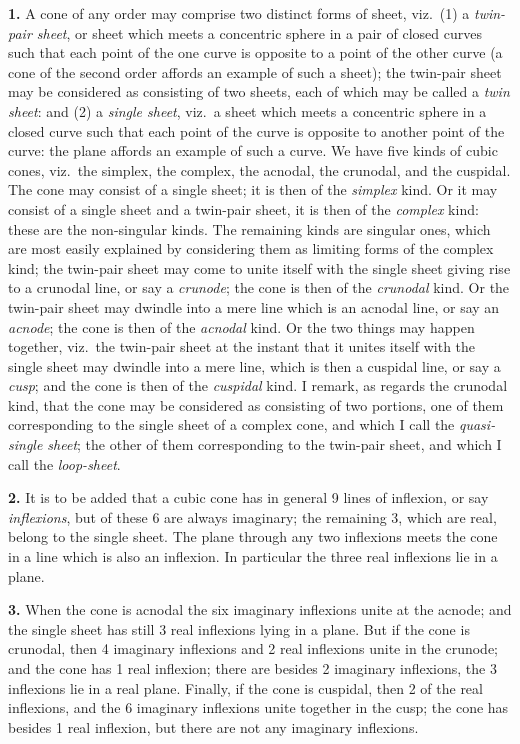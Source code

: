 \documentclass[11pt,a4paper]{article}
\theoremstyle{plain}
\begin{document}
\noindent\textbf{1.} A cone of any order may comprise two distinct forms of sheet, viz.\ (1) a \textit{twin-pair sheet}, or sheet which meets a concentric sphere in a pair of closed curves such that each point of the one curve is opposite to a point of the other curve (a cone of the second order affords an example of such a sheet); the twin-pair sheet may be considered as consisting of two sheets, each of which may be called a \textit{twin sheet}: and (2) a \textit{single sheet}, viz.\ a sheet which meets a concentric sphere in a closed curve such that each point of the curve is opposite to another point of the curve: the plane affords an example of such a curve. We have five kinds of cubic cones, viz.\ the simplex, the complex, the acnodal, the crunodal, and the cuspidal. The cone may consist of a single sheet; it is then of the \textit{simplex} kind. Or it may consist of a single sheet and a twin-pair sheet, it is then of the \textit{complex} kind: these are the non-singular kinds. The remaining kinds are singular ones, which are most easily explained by considering them as limiting forms of the complex kind; the twin-pair sheet may come to unite itself with the single sheet giving rise to a crunodal line, or say a \textit{crunode}; the cone is then of the \textit{crunodal} kind. Or the twin-pair sheet may dwindle into a mere line which is an acnodal line, or say an \textit{acnode}; the cone is then of the \textit{acnodal} kind. Or the two things may happen together, viz.\ the twin-pair sheet at the instant that it unites itself with the single sheet may dwindle into a mere line, which is then a cuspidal line, or say a \textit{cusp}; and the cone is then of the \textit{cuspidal} kind. I remark, as regards the crunodal kind, that the cone may be considered as consisting of two portions, one of them corresponding to the single sheet of a complex cone, and which I call the \textit{quasi-single sheet}; the other of them corresponding to the twin-pair sheet, and which I call the \textit{loop-sheet}.

\noindent\textbf{2.} It is to be added that a cubic cone has in general 9 lines of inflexion, or say \textit{inflexions}, but of these 6 are always imaginary; the remaining 3, which are real, belong to the single sheet. The plane through any two inflexions meets the cone in a line which is also an inflexion. In particular the three real inflexions lie in a plane.

\noindent\textbf{3.} When the cone is acnodal the six imaginary inflexions unite at the acnode; and the single sheet has still 3 real inflexions lying in a plane. But if the cone is crunodal, then 4 imaginary inflexions and 2 real inflexions unite in the crunode; and the cone has 1 real inflexion; there are besides 2 imaginary inflexions, the 3 inflexions lie in a real plane. Finally, if the cone is cuspidal, then 2 of the real inflexions, and the 6 imaginary inflexions unite together in the cusp; the cone has besides 1 real inflexion, but there are not any imaginary inflexions.
\end{document}
